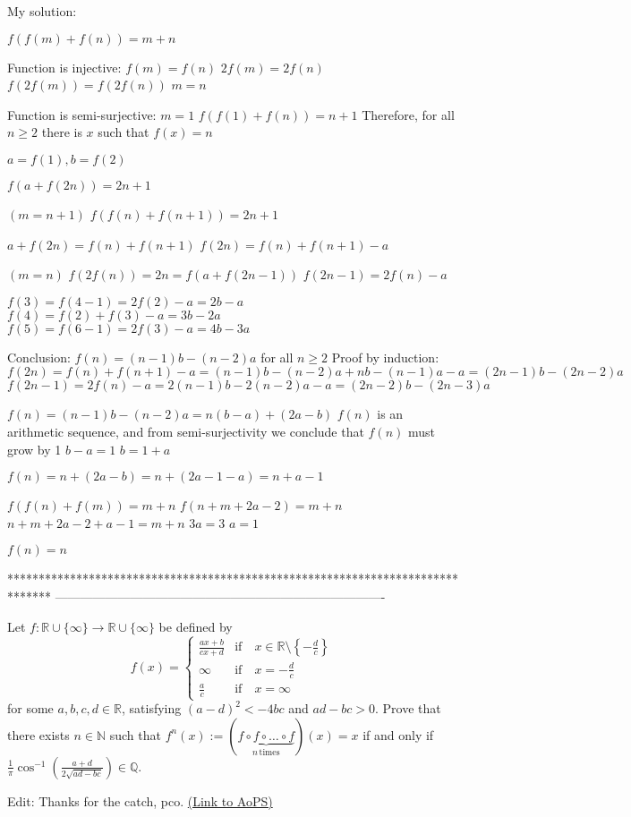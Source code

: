 \begin{solution}
	My solution:

$f(f(m)+f(n))=m+n$

Function is injective:
$f(m)=f(n)$
$2f(m)=2f(n)$
$f(2f(m))=f(2f(n))$
$m=n$

Function is semi-surjective:
$m=1$
$f(f(1)+f(n))=n+1$
Therefore, for all $n\geqslant 2$ there is $x$ such that $f(x)=n$

$a=f(1), b=f(2)$

$f(a+f(2n))=2n+1$

$(m=n+1)$
$f(f(n)+f(n+1))=2n+1$

$a+f(2n)=f(n)+f(n+1)$
$f(2n)=f(n)+f(n+1)-a$

$(m=n)$
$f(2f(n))=2n=f(a+f(2n-1))$
$f(2n-1)=2f(n)-a$


$f(3)=f(4-1)=2f(2)-a=2b-a$
$f(4)=f(2)+f(3)-a=3b-2a$
$f(5)=f(6-1)=2f(3)-a=4b-3a$

Conclusion: $f(n)=(n-1)b-(n-2)a$ for all $n\geqslant 2$
Proof by induction:
$f(2n)=f(n)+f(n+1)-a=(n-1)b-(n-2)a+nb-(n-1)a-a=(2n-1)b-(2n-2)a$
$f(2n-1)=2f(n)-a=2(n-1)b-2(n-2)a-a=(2n-2)b-(2n-3)a$

$f(n)=(n-1)b-(n-2)a=n(b-a)+(2a-b)$
$f(n)$ is an arithmetic sequence, and from semi-surjectivity we conclude that $f(n)$ must grow by 1
$b-a=1$
$b=1+a$

$f(n)=n+(2a-b)=n+(2a-1-a)=n+a-1$


$f(f(n)+f(m))=m+n$
$f(n+m+2a-2)=m+n$
$n+m+2a-2+a-1=m+n$
$3a=3$
$a=1$

$f(n)=n$
\end{solution}
*******************************************************************************
-------------------------------------------------------------------------------

\begin{problem}
	Let $f: \mathbb{R} \cup \{\infty\} \to \mathbb{R} \cup \{\infty\}$ be defined by
\[ f(x) = \begin{cases} \frac{ax+b}{cx + d} & \mathrm{if} \quad x \in \mathbb{R} \setminus \left\{-\frac{d}{c}\right\} \\ \infty & \mathrm{if} \quad x = -\frac{d}{c} \\
\frac{a}{c} & \mathrm{if} \quad x = \infty \end{cases} \]
for some $a, b, c, d \in \mathbb{R}$, satisfying $(a - d)^2 < -4bc$ and $ad - bc > 0$.
Prove that there exists $n \in \mathbb{N}$ such that $f^{n}(x) := (\underbrace{f \circ f \circ \dots \circ f}_{n \, \mathrm{times}})(x) = x$ if and only if $\frac{1}{\pi}\cos^{-1}\left(\frac{a+d}{2\sqrt{ad - bc}}\right) \in \mathbb{Q}$.

Edit: Thanks for the catch, pco.
	\flushright \href{https://artofproblemsolving.com/community/c6h560674}{(Link to AoPS)}
\end{problem}



